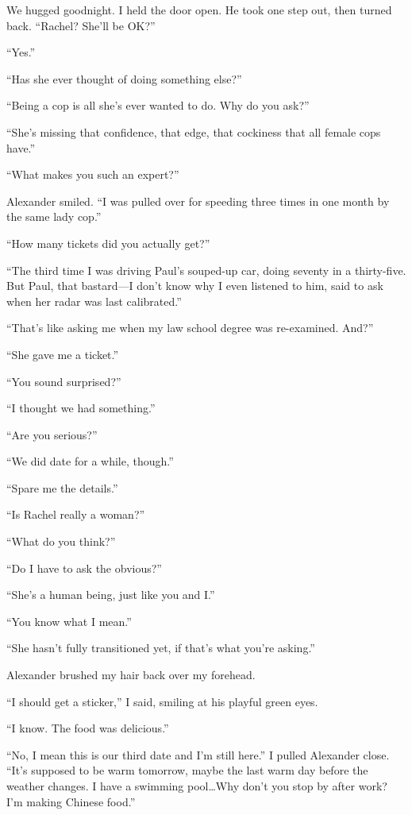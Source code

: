 We hugged goodnight. I held the door open. He took one step out, then
turned back. ``Rachel? She'll be OK?''

``Yes.''

``Has she ever thought of doing something else?''

``Being a cop is all she's ever wanted to do. Why do you ask?''

``She's missing that confidence, that edge, that cockiness that all
female cops have.''

``What makes you such an expert?''

Alexander smiled. ``I was pulled over for speeding three times in one
month by the same lady cop.''

``How many tickets did you actually get?''

``The third time I was driving Paul's souped-up car, doing seventy in a
thirty-five. But Paul, that bastard---I don't know why I even listened
to him, said to ask when her radar was last calibrated.''

``That's like asking me when my law school degree was re-examined.
And?''

``She gave me a ticket.''

``You sound surprised?''

``I thought we had something.''

``Are you serious?''

``We did date for a while, though.''

``Spare me the details.''

``Is Rachel really a woman?''

``What do you think?''

``Do I have to ask the obvious?''

``She's a human being, just like you and I.''

``You know what I mean.''

``She hasn't fully transitioned yet, if that's what you're asking.''

Alexander brushed my hair back over my forehead.

``I should get a sticker,'' I said, smiling at his playful green eyes.

``I know. The food was delicious.''

``No, I mean this is our third date and I'm still here.'' I pulled
Alexander close. ``It's supposed to be warm tomorrow, maybe the last
warm day before the weather changes. I have a swimming pool\ldots Why
don't you stop by after work? I'm making Chinese food.''


